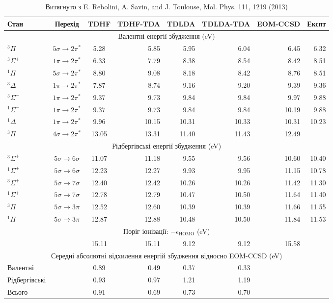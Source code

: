 \documentclass{PySCFBook}
\begin{document}
\begin{table}[h]
\centering
\small
\begin{tabular}{lccrrrrr}
\toprule
Стан & Перехід & TDHF & TDHF-TDA & TDLDA & TDLDA-TDA & EOM-CCSD & Експт \\
\midrule
\multicolumn{8}{c}{Валентні енергії збудження (eV)} \\
$^3\Pi$ & $5\sigma \to 2\pi^*$ & 5.28 & 5.85 & 5.95 & 6.04 & 6.45 & 6.32 \\
$^3\Sigma^+$ & $1\pi \to 2\pi^*$ & 6.33 & 7.79 & 8.38 & 8.54 & 8.42 & 8.51 \\
$^1\Pi$ & $5\sigma \to 2\pi^*$ & 8.80 & 9.08 & 8.18 & 8.42 & 8.76 & 8.51 \\
$^3\Delta$ & $1\pi \to 2\pi^*$ & 7.87 & 8.74 & 9.16 & 9.20 & 9.39 & 9.36 \\
$^3\Sigma^-$ & $1\pi \to 2\pi^*$ & 9.37 & 9.73 & 9.84 & 9.84 & 9.97 & 9.88 \\
$^1\Sigma^-$ & $1\pi \to 2\pi^*$ & 9.37 & 9.73 & 9.84 & 9.84 & 10.19 & 9.88 \\
$^1\Delta$ & $1\pi \to 2\pi^*$ & 9.96 & 10.15 & 10.31 & 10.33 & 10.31 & 10.23 \\
$^3\Pi$ & $4\sigma \to 2\pi^*$ & 13.05 & 13.31 & 11.40 & 11.43 & 12.49 &  \\
\multicolumn{8}{c}{Рідбергівські енергії збудження (eV)} \\
$^3\Sigma^+$ & $5\sigma \to 6\sigma$ & 11.07 & 11.18 & 9.55 & 9.56 & 10.60 & 10.40 \\
$^1\Sigma^+$ & $5\sigma \to 6\sigma$ & 12.23 & 12.27 & 9.93 & 9.95 & 11.15 & 10.78 \\
$^3\Sigma^+$ & $5\sigma \to 7\sigma$ & 12.40 & 12.42 & 10.26 & 10.26 & 11.42 & 11.30 \\
$^1\Sigma^+$ & $5\sigma \to 7\sigma$ & 12.78 & 12.79 & 10.47 & 10.50 & 11.64 & 11.40 \\
$^3\Pi$ & $5\sigma \to 3\pi$ & 12.52 & 12.60 & 10.39 & 10.39 & 11.66 & 11.55 \\
$^1\Pi$ & $5\sigma \to 3\pi$ & 12.87 & 12.88 & 10.48 & 10.50 & 11.84 & 11.53 \\
\multicolumn{8}{c}{Поріг іонізації: $-\epsilon_{\text{HOMO}}$ (eV)} \\
 &  & 15.11 & 15.11 & 9.12 & 9.12 & 15.58 &  \\
\multicolumn{8}{c}{Середні абсолютні відхилення енергій збудження відносно EOM-CCSD (eV)} \\
Валентні &  & 0.89 & 0.49 & 0.37 & 0.33 &  &  \\
Рідбергівські &  & 0.93 & 0.97 & 1.21 & 1.19 &  &  \\
Всього &  & 0.91 & 0.69 & 0.73 & 0.70 &  &  \\
\bottomrule
\end{tabular}
\caption{Витягнуто з E. Rebolini, A. Savin, and J. Toulouse, Mol. Phys. 111, 1219 (2013)}
\end{table}
\end{document}
